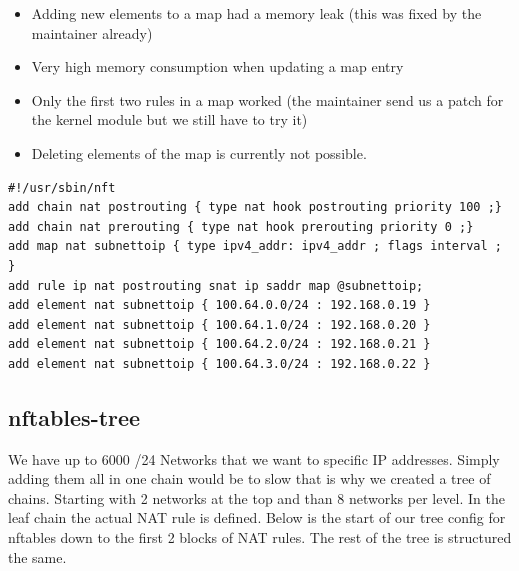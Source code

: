 \documentclass{report}
\begin{document}
\begin{itemize}
\itemsep1pt\parskip0pt
\item
  Adding new elements to a map had a memory leak (this was fixed by the
  maintainer already)
\item
  Very high memory consumption when updating a map entry
\item
  Only the first two rules in a map worked (the maintainer send us a
  patch for the kernel module but we still have to try it)
\item
  Deleting elements of the map is currently not possible.
\end{itemize}

\begin{verbatim}
#!/usr/sbin/nft
add chain nat postrouting { type nat hook postrouting priority 100 ;}
add chain nat prerouting { type nat hook prerouting priority 0 ;}
add map nat subnettoip { type ipv4_addr: ipv4_addr ; flags interval ; }
add rule ip nat postrouting snat ip saddr map @subnettoip;
add element nat subnettoip { 100.64.0.0/24 : 192.168.0.19 }
add element nat subnettoip { 100.64.1.0/24 : 192.168.0.20 }
add element nat subnettoip { 100.64.2.0/24 : 192.168.0.21 }
add element nat subnettoip { 100.64.3.0/24 : 192.168.0.22 }
\end{verbatim}

\subsection{nftables-tree}

We have up to 6000 /24 Networks that we want to specific IP addresses.
Simply adding them all in one chain would be to slow that is why we
created a tree of chains. Starting with 2 networks at the top and than 8
networks per level. In the leaf chain the actual NAT rule is defined.
Below is the start of our tree config for nftables down to the first 2
blocks of NAT rules. The rest of the tree is structured the same.
\end{document}

